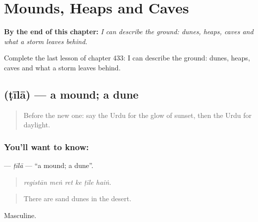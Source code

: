 
\chapter{Mounds, Heaps and Caves}
\label{ch:ur-mounds-heaps-and-caves}

\begin{chapteropening}
\textbf{By the end of this chapter:} \emph{I can describe the ground: dunes, heaps, caves and what a storm leaves behind.}

Complete the last lesson of chapter 433: I can describe the ground: dunes, heaps, caves and what a storm leaves behind.
\end{chapteropening}

\section[\texorpdfstring{\ur{ٹیلا} (ṭīlā)}{ٹیلا (ṭīlā)}]{ (ṭīlā) — a mound; a dune}

\label{lesson:UR-C433-tila}



\begin{quote}
Before the new one: say the Urdu for the glow of sunset, then the Urdu for daylight.
\end{quote}

\subsection*{You'll want to know: }
\textbf{} — \emph{ṭīlā} — \textquotedblleft{}a mound; a dune\textquotedblright{}.

\begin{quote}
     
\end{quote}

\begin{quote}
\emph{registān meṅ ret ke ṭīle haiṅ.}
\end{quote}

\begin{quote}
There are sand dunes in the desert.
\end{quote}

Masculine.


